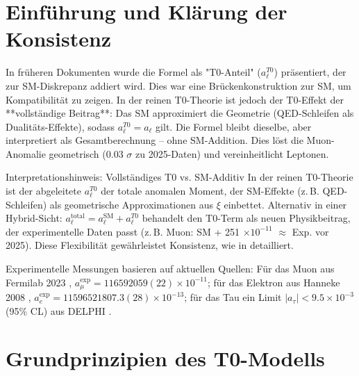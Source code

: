\documentclass[12pt,a4paper]{article}
\begin{document}
	\section{Einführung und Klärung der Konsistenz}
	In früheren Dokumenten wurde die Formel als "T0-Anteil" ($a_\ell^{T0}$) präsentiert, der zur SM-Diskrepanz addiert wird. Dies war eine Brückenkonstruktion zur SM, um Kompatibilität zu zeigen. In der reinen T0-Theorie \cite{T0_SI} ist jedoch der T0-Effekt der **vollständige Beitrag**: Das SM approximiert die Geometrie (QED-Schleifen als Dualitäts-Effekte), sodass $a_\ell^{T0} = a_\ell$ gilt. Die Formel bleibt dieselbe, aber interpretiert als Gesamtberechnung – ohne SM-Addition. Dies löst die Muon-Anomalie geometrisch (0.03 $\sigma$ zu 2025-Daten) und vereinheitlicht Leptonen.
	
	\begin{interpretation}{Interpretationshinweis: Vollständiges T0 vs. SM-Additiv}
		In der reinen T0-Theorie ist der abgeleitete $a_\ell^{T0}$ der totale anomalen Moment, der SM-Effekte (z.\,B. QED-Schleifen) als geometrische Approximationen aus $\xi$ einbettet. Alternativ in einer Hybrid-Sicht: $a_\ell^\text{total} = a_\ell^\text{SM} + a_\ell^{T0}$ behandelt den T0-Term als neuen Physikbeitrag, der experimentelle Daten passt (z.\,B. Muon: SM + 251 $\times 10^{-11}$ $\approx$ Exp. vor 2025). Diese Flexibilität gewährleistet Konsistenz, wie in \cite{T0_verhaeltnis_absolut} detailliert.
	\end{interpretation}
	
	Experimentelle Messungen basieren auf aktuellen Quellen: Für das Muon aus Fermilab 2023 \cite{Fermilab2023}, $a_\mu^\text{exp} = 116592059(22) \times 10^{-11}$; für das Elektron aus Hanneke 2008 \cite{Hanneke2008}, $a_e^\text{exp} = 11596521807.3(28) \times 10^{-13}$; für das Tau ein Limit $|a_\tau| < 9.5 \times 10^{-3}$ (95\% CL) aus DELPHI \cite{DELPHI2004}.
	
	\section{Grundprinzipien des T0-Modells}
\end{document}
